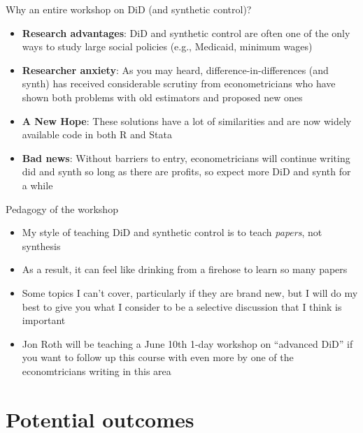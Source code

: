 \documentclass{beamer}
\begin{document}
\begin{frame}{Why an entire workshop on DiD (and synthetic control)?}

\begin{itemize}
\item \textbf{Research advantages}: DiD and synthetic control are often one of the only ways to study large social policies (e.g., Medicaid, minimum wages)
\item \textbf{Researcher anxiety}: As you may heard, difference-in-differences (and synth) has received considerable scrutiny from econometricians who have shown both problems with old estimators and proposed new ones
\item \textbf{A New Hope}: These solutions have a lot of similarities and are now widely available code in both R and Stata
\item \textbf{Bad news}:  Without barriers to entry, econometricians will continue writing did and synth so long as there are profits, so expect more DiD and synth for a while
\end{itemize}

\end{frame}

\begin{frame}{Pedagogy of the workshop}

\begin{itemize}
\item My style of teaching DiD and synthetic control is to teach \emph{papers}, not synthesis
\item As a result, it can feel like drinking from a firehose to learn so many papers
\item Some topics I can't cover, particularly if they are brand new, but I will do my best to give you what I consider to be a selective discussion that I think is important
\item Jon Roth will be teaching a June 10th 1-day workshop on ``advanced DiD'' if you want to follow up this course with even more by one of the economtricians writing in this area
\end{itemize}

\end{frame}


\section{Potential outcomes}
\end{document}
